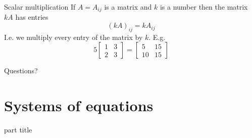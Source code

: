 \documentclass{beamer}
\begin{document}
\begin{frame}{Scalar multiplication}
  If $A = A_{ij}$ is a matrix and $k$ is a number then the matrix $kA$ has entries
  \begin{equation*}
    (kA)_{ij} = k A_{ij}
  \end{equation*}\vfill
  I.e. we multiply every entry of the matrix by $k$. E.g.\vfill
  \begin{equation*}
    5 \left[
        \begin{array}{cc}
          1 & 3 \\
          2 & 3
        \end{array}
      \right]=
      \left[
        \begin{array}{cc}
          5 & 15 \\
          10 & 15
        \end{array}
      \right]
  \end{equation*}
\end{frame}

\begin{frame}
  Questions?
\end{frame}

\section{Systems of equations}

\begin{frame}
  \begin{beamercolorbox}[sep=12pt,center]{part title}
    \insertsection\par
  \end{beamercolorbox}
\end{frame}
\end{document}
